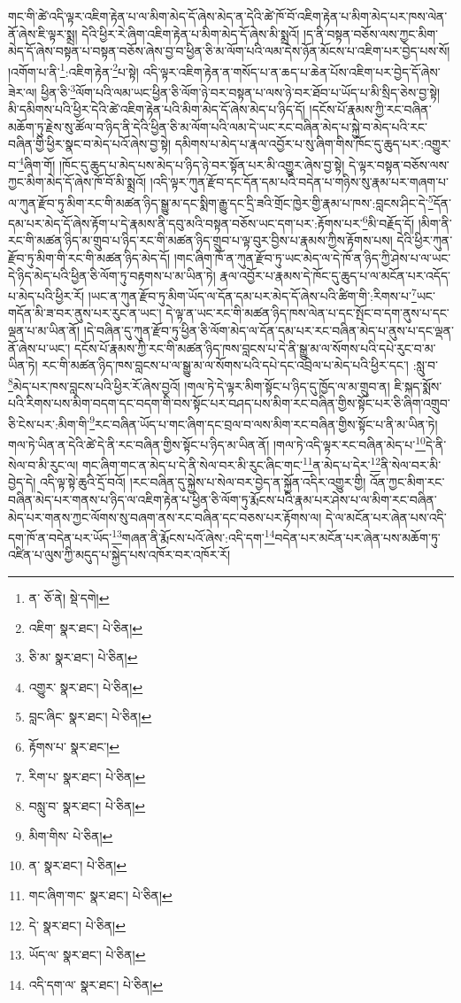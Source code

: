 གང་གི་ཚེ་འདི་ལྟར་འཇིག་རྟེན་པ་ལ་མིག་མེད་དོ་ཞེས་མེད་ན་དེའི་ཚེ་ཁོ་བོ་འཇིག་རྟེན་པ་མིག་མེད་པར་ཁས་ལེན་ནོ་ཞེས་ཇི་ལྟར་སྨྲ། དེའི་ཕྱིར་རེ་ཞིག་འཇིག་རྟེན་པ་མིག་མེད་དོ་ཞེས་མི་སྨྲའོ། །ད་ནི་བསྟན་བཅོས་ལས་ཀྱང་མིག་མེད་དོ་ཞེས་བསྟན་པ་བསྟན་བཅོས་ཞེས་བྱ་བ་ཕྱིན་ཅི་མ་ལོག་པའི་ལམ་དེས་ཉོན་མོངས་པ་འཇིག་པར་བྱེད་པས་སོ། །འགོག་པ་ནི་\footnote{ན་  ཅོ་ནེ།  སྡེ་དགེ། }:འཇིག་རྟེན་\footnote{འཇིག་  སྣར་ཐང་།  པེ་ཅིན། }པ་སྟེ། འདི་ལྟར་འཇིག་རྟེན་ན་གསོད་པ་ན་ཆད་པ་ཆེན་པོས་འཇིག་པར་བྱེད་དོ་ཞེས་ཟེར་ལ། ཕྱིན་ཅི་\footnote{ཅི་མ་  སྣར་ཐང་།  པེ་ཅིན། }ལོག་པའི་ལམ་ཡང་ཕྱིན་ཅི་ལོག་ཉེ་བར་བསྟན་པ་ལས་ཉེ་བར་ཐོབ་པ་ཡོད་པ་མི་སྲིད་ཅེས་བྱ་སྟེ། མི་དམིགས་པའི་ཕྱིར་དེའི་ཚེ་འཇིག་རྟེན་པའི་མིག་མེད་དོ་ཞེས་མེད་པ་ཉིད་དོ། །དངོས་པོ་རྣམས་ཀྱི་རང་བཞིན་མཆོག་ཏུ་རྗེས་སུ་ཚོལ་བ་ཉིད་ནི་དེའི་ཕྱིན་ཅི་མ་ལོག་པའི་ལམ་དེ་ཡང་རང་བཞིན་མེད་པ་སྐྱེ་བ་མེད་པའི་རང་བཞིན་གྱི་ཕྱིར་སྣང་བ་མེད་པའོ་ཞེས་བྱ་སྟེ། དམིགས་པ་མེད་པ་རྣལ་འབྱོར་པ་སུ་ཞིག་གིས་ཁོང་དུ་ཆུད་པར་:འགྱུར་བ་\footnote{འགྱུར་  སྣར་ཐང་།  པེ་ཅིན། }ཞིག་གོ། །ཁོང་དུ་ཆུད་པ་མེད་པས་མེད་པ་ཉིད་ཉེ་བར་སྟོན་པར་མི་འགྱུར་ཞེས་བྱ་སྟེ། དེ་ལྟར་བསྟན་བཅོས་ལས་ཀྱང་མིག་མེད་དོ་ཞེས་ཁོ་བོ་མི་སྨྲའོ། །འདི་ལྟར་ཀུན་རྫོབ་དང་དོན་དམ་པའི་བདེན་པ་གཉིས་སུ་རྣམ་པར་གཞག་པ་ལ་ཀུན་རྫོབ་ཏུ་མིག་རང་གི་མཚན་ཉིད་སྒྱུ་མ་དང་སྨིག་རྒྱུ་དང་དྲི་ཟའི་གྲོང་ཁྱེར་གྱི་རྣམ་པ་ཁས་:བླངས་ཤིང་དེ་\footnote{བླང་ཞིང་  སྣར་ཐང་།  པེ་ཅིན། }དོན་དམ་པར་མེད་དོ་ཞེས་རྟོག་པ་དེ་རྣམས་ནི་དབུ་མའི་བསྟན་བཅོས་ཡང་དག་པར་:རྟོགས་པར་\footnote{རྟོགས་པ་  སྣར་ཐང་། }མི་བརྗོད་དོ། །མིག་ནི་རང་གི་མཚན་ཉིད་མ་གྲུབ་པ་ཉིད་རང་གི་མཚན་ཉིད་གྲུབ་པ་ལྟ་བུར་བྱིས་པ་རྣམས་ཀྱིས་རྟོགས་པས། དེའི་ཕྱིར་ཀུན་རྫོབ་ཏུ་མིག་གི་རང་གི་མཚན་ཉིད་མེད་དོ། །གང་ཞིག་ཁོ་ན་ཀུན་རྫོབ་ཏུ་ཡང་མེད་ལ་དེ་ཁོ་ན་ཉིད་ཀྱི་ཤེས་པ་ལ་ཡང་དེ་ཉིད་མེད་པའི་ཕྱིན་ཅི་ལོག་ཏུ་བརྟགས་པ་མ་ཡིན་ཏེ། རྣལ་འབྱོར་པ་རྣམས་དེ་ཁོང་དུ་ཆུད་པ་ལ་མངོན་པར་འདོད་པ་མེད་པའི་ཕྱིར་རོ། །ཡང་ན་ཀུན་རྫོབ་ཏུ་མིག་ཡོད་ལ་དོན་དམ་པར་མེད་དོ་ཞེས་པའི་ཚིག་གི་:རིགས་པ་\footnote{རིག་པ་  སྣར་ཐང་།  པེ་ཅིན། }ཡང་གདོན་མི་ཟ་བར་ནུས་པར་རུང་ན་ཡང་། དེ་ལྟ་ན་ཡང་རང་གི་མཚན་ཉིད་ཁས་ལེན་པ་དང་སྤོང་བ་དག་ནུས་པ་དང་ལྡན་པ་མ་ཡིན་ནོ། །དེ་བཞིན་དུ་ཀུན་རྫོབ་ཏུ་ཕྱིན་ཅི་ལོག་མེད་ལ་དོན་དམ་པར་རང་བཞིན་མེད་པ་ནུས་པ་དང་ལྡན་ནོ་ཞེས་པ་ཡང་། དངོས་པོ་རྣམས་ཀྱི་རང་གི་མཚན་ཉིད་ཁས་བླངས་པ་དེ་ནི་སྒྱུ་མ་ལ་སོགས་པའི་དཔེ་རུང་བ་མ་ཡིན་ཏེ། རང་གི་མཚན་ཉིད་ཁས་བླངས་པ་ལ་སྒྱུ་མ་ལ་སོགས་པའི་དཔེ་དང་འབྲེལ་པ་མེད་པའི་ཕྱིར་དང་། :སླུ་བ་\footnote{བསླུ་བ་  སྣར་ཐང་།  པེ་ཅིན། }མེད་པར་ཁས་བླངས་པའི་ཕྱིར་རོ་ཞེས་བྱའོ། །གལ་ཏེ་དེ་ལྟར་མིག་སྟོང་པ་ཉིད་དུ་ཁྱོད་ལ་མ་གྲུབ་ན། ཇི་སྐད་སྨོས་པའི་རིགས་པས་མིག་བདག་དང་བདག་གི་བས་སྟོང་པར་བཤད་པས་མིག་རང་བཞིན་གྱིས་སྟོང་པར་ཅི་ཞིག་འགྲུབ་ཅི་ངེས་པར་:མིག་གི་\footnote{མིག་གིས་  པེ་ཅིན། }རང་བཞིན་ཡོད་པ་གང་ཞིག་དང་བྲལ་བ་ལས་མིག་རང་བཞིན་གྱིས་སྟོང་པ་ནི་མ་ཡིན་ཏེ། གལ་ཏེ་ཡིན་ན་དེའི་ཚེ་དེ་ནི་རང་བཞིན་གྱིས་སྟོང་པ་ཉིད་མ་ཡིན་ནོ། །གལ་ཏེ་འདི་ལྟར་རང་བཞིན་མེད་པ་\footnote{ན་  སྣར་ཐང་།  པེ་ཅིན། }དེ་ནི་སེལ་བ་མི་རུང་ལ། གང་ཞིག་གང་ན་མེད་པ་དེ་ནི་སེལ་བར་མི་རུང་ཞིང་གང་\footnote{གང་ཞིག་གང་  སྣར་ཐང་།  པེ་ཅིན། }ན་མེད་པ་དེར་\footnote{དེ་  སྣར་ཐང་།  པེ་ཅིན། }ནི་སེལ་བར་མི་བྱེད་དེ། འདི་ལྟ་སྟེ་ཆུའི་དྲོ་བའོ། །རང་བཞིན་དུ་སྐྱེས་པ་སེལ་བར་བྱེད་ན་སྐྱོན་འདིར་འགྱུར་གྱི། འོན་ཀྱང་མིག་རང་བཞིན་མེད་པར་གནས་པ་ཉིད་ལ་འཇིག་རྟེན་པ་ཕྱིན་ཅི་ལོག་ཏུ་རྨོངས་པའི་རྣམ་པར་ཤེས་པ་ལ་མིག་རང་བཞིན་མེད་པར་གནས་ཀྱང་ལོགས་སུ་བཞག་ནས་རང་བཞིན་དང་བཅས་པར་རྟོགས་ལ། དེ་ལ་མངོན་པར་ཞེན་པས་འདི་དག་ཁོ་ན་བདེན་པར་ཡོད་\footnote{ཡོད་ལ་  སྣར་ཐང་།  པེ་ཅིན། }གཞན་ནི་རྨོངས་པའོ་ཞེས་:འདི་དག་\footnote{འདི་དག་ལ་  སྣར་ཐང་།  པེ་ཅིན། }བདེན་པར་མངོན་པར་ཞེན་པས་མཆོག་ཏུ་འཛིན་པ་ལུས་ཀྱི་མདུད་པ་སྐྱེད་པས་འཁོར་བར་འཁོར་རོ། 